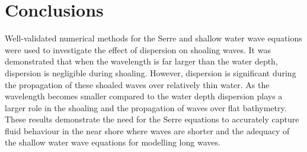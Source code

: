 \documentclass[a4paper,fleqn]{article} %
\begin{document}
\section{Conclusions}
\label{Conclusions}
Well-validated numerical methods for the Serre and shallow water wave equations  were used to investigate the effect of dispersion on shoaling waves. It was demonstrated that when the wavelength is far larger than the water depth, dispersion is negligible during shoaling. However, dispersion is significant during the propagation of these shoaled waves over relatively thin water. As the wavelength becomes smaller compared to the water depth dispersion plays a larger role in the shoaling and the propagation of waves over flat bathymetry. These results demonstrate the need for the Serre equations to accurately capture fluid behaviour in the near shore where waves are shorter and the adequacy of the shallow water wave equations for modelling long waves. 



\end{document}
